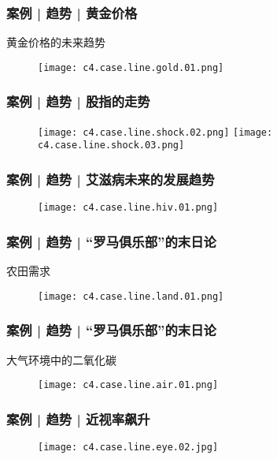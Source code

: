 \begin{frame}
  \frametitle{案例 | 趋势 | 黄金价格}
  \begin{block}{黄金价格的未来趋势}
    \begin{figure}
      \centering
      \texttt{[image: c4.case.line.gold.01.png]}
    \end{figure}
  \end{block}
\end{frame}

\begin{frame}
  \frametitle{案例 | 趋势 | 股指的走势}
  \begin{figure}
    \centering
    \texttt{[image: c4.case.line.shock.02.png]}\quad
    \texttt{[image: c4.case.line.shock.03.png]}
  \end{figure}
\end{frame}

\begin{frame}
  \frametitle{案例 | 趋势 | 艾滋病未来的发展趋势}
  \begin{figure}
    \centering
    \texttt{[image: c4.case.line.hiv.01.png]}
  \end{figure}
\end{frame}

\begin{frame}
  \frametitle{案例 | 趋势 | “罗马俱乐部”的末日论}
  \begin{block}{农田需求}
    \begin{figure}
      \centering
      \texttt{[image: c4.case.line.land.01.png]}
    \end{figure}
  \end{block}
\end{frame}

\begin{frame}
  \frametitle{案例 | 趋势 | “罗马俱乐部”的末日论}
  \begin{block}{大气环境中的二氧化碳}
    \begin{figure}
      \centering
      \texttt{[image: c4.case.line.air.01.png]}
    \end{figure}
  \end{block}
\end{frame}

\begin{frame}
  \frametitle{案例 | 趋势 | 近视率飙升}
    \begin{figure}
      \centering
      \texttt{[image: c4.case.line.eye.02.jpg]}
    \end{figure}
\end{frame}

